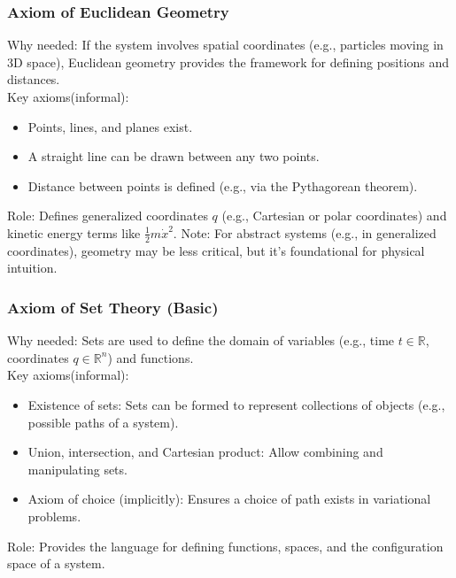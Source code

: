 \subsubsection{Axiom of Euclidean Geometry}
Why needed: If the system involves spatial coordinates (e.g., particles moving in 3D space), Euclidean geometry provides the framework for defining positions and distances.
\\
Key axioms(informal):
\begin{itemize}
    \item Points, lines, and planes exist.
    \item A straight line can be drawn between any two points.
    \item Distance between points is defined (e.g., via the Pythagorean theorem).

\end{itemize}

Role: Defines generalized coordinates $ q $ (e.g., Cartesian or polar coordinates) and kinetic energy terms like $ \frac{1}{2} m \dot{x}^2 $.
Note: For abstract systems (e.g., in generalized coordinates), geometry may be less critical, but it’s foundational for physical intuition.

\subsubsection{Axiom of Set Theory (Basic)}
Why needed: Sets are used to define the domain of variables (e.g., time $ t \in \mathbb{R} $, coordinates $ q \in \mathbb{R}^n $) and functions.
\\
Key axioms(informal):
\begin{itemize}
    \item Existence of sets: Sets can be formed to represent collections of objects (e.g., possible paths of a system).
    \item Union, intersection, and Cartesian product: Allow combining and manipulating sets.
    \item Axiom of choice (implicitly): Ensures a choice of path exists in variational problems.

\end{itemize}

Role: Provides the language for defining functions, spaces, and the configuration space of a system.

